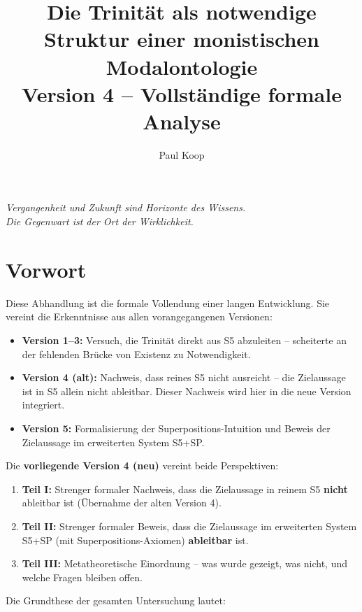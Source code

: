 \documentclass[
]{article}
\title{Die Trinität als notwendige Struktur einer monistischen Modalontologie \\ \large Version 4 – Vollständige formale Analyse}
\author{Paul Koop}
\date{}
\begin{document}
\maketitle

\begin{center}
\emph{Vergangenheit und Zukunft sind Horizonte des Wissens. \\ Die Gegenwart ist der Ort der Wirklichkeit.}
\end{center}

\newpage
{
\setcounter{tocdepth}{3}
\tableofcontents
}
\newpage

\section{Vorwort}

Diese Abhandlung ist die formale Vollendung einer langen Entwicklung. Sie vereint die Erkenntnisse aus allen vorangegangenen Versionen:

\begin{itemize}
\item \textbf{Version 1–3:} Versuch, die Trinität direkt aus S5 abzuleiten – scheiterte an der fehlenden Brücke von Existenz zu Notwendigkeit.
\item \textbf{Version 4 (alt):} Nachweis, dass reines S5 nicht ausreicht – die Zielaussage ist in S5 allein nicht ableitbar. Dieser Nachweis wird hier in die neue Version integriert.
\item \textbf{Version 5:} Formalisierung der Superpositions-Intuition und Beweis der Zielaussage im erweiterten System S5+SP.
\end{itemize}

Die \textbf{vorliegende Version 4 (neu)} vereint beide Perspektiven:

\begin{enumerate}
\item \textbf{Teil I:} Strenger formaler Nachweis, dass die Zielaussage in reinem S5 \textbf{nicht} ableitbar ist (Übernahme der alten Version 4).
\item \textbf{Teil II:} Strenger formaler Beweis, dass die Zielaussage im erweiterten System S5+SP (mit Superpositions-Axiomen) \textbf{ableitbar} ist.
\item \textbf{Teil III:} Metatheoretische Einordnung – was wurde gezeigt, was nicht, und welche Fragen bleiben offen.
\end{enumerate}

Die Grundthese der gesamten Untersuchung lautet:
\end{document}
